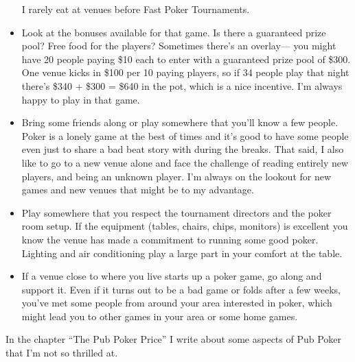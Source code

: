 \begin{itemize}
I rarely eat at venues before Fast Poker Tournaments.


\item Look at the bonuses available for that game. Is there a
guaranteed prize pool? Free food for the players? Sometimes
there's an overlay--- you might have 20 people paying \$10 each
to enter with a guaranteed prize pool of \$300. One venue kicks
in \$100 per 10 paying players, so if 34 people play that night
there's \$340 + \$300 = \$640 in the pot, which is a nice incentive.
I'm always happy to play in that game.

\item Bring some friends along or play somewhere that you'll
know a few people. Poker is a lonely game at the best
of times and it's good to have some people even just to share
a bad beat story with during the breaks. That said, I also like
to go to a new venue alone and face the challenge of
reading entirely new players, and being an unknown player.
I'm always on the lookout for new games and new venues that
might be to my advantage.

\item Play somewhere that you respect the tournament directors
and the poker room setup. If the equipment (tables, chairs, chips,
monitors) is excellent you know the venue has made a commitment
to running some good poker. Lighting and air conditioning
play a large part in your comfort at the table.

\item If a venue close to where you live starts
up a poker game, go along and support it. Even if it turns out to
be a bad game or folds after a few weeks, you've met some people
from around your area interested in poker, which might lead
you to other games in your area or some home games.

\end{itemize}

In the chapter ``The Pub Poker Price'' I write about some
aspects of Pub Poker that I'm not so thrilled at.
